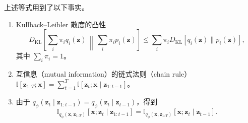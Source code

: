 上述等式用到了以下事实。
\begin{enumerate}
\item Kullback–Leibler 散度的凸性
\[
D_{\mathrm{KL}}\left[\sum_i\pi_i q_i(\mathbf{z})\,\middle\|\,\sum_i\pi_i p_i(\mathbf{z})\right]
 \leq\sum_i\pi_iD_{\mathrm{KL}}[q_i(\mathbf{z})\|p_i(\mathbf{z})],
\]
其中 $\sum_i\pi_i=1$。
\item 互信息（mutual information）的链式法则（chain rule）$\mathbb{I}[\mathbf{z}_{1:T};\mathbf{x}]=\sum_{t=1}^T\mathbb{I}[\mathbf{z}_t;\mathbf{x}\mid\mathbf{z}_{1:t-1}]$。
\item 由于 $q_\phi(\mathbf{z}_t\mid\mathbf{z}_{1:t-1})=q_\phi(\mathbf{z}_t\mid\mathbf{z}_{t-1})$，得到
\[
\mathbb{I}_{q_\phi(\mathbf{x},\mathbf{z}_{1:T})}[\mathbf{x};\mathbf{z}_t\mid\mathbf{z}_{1:t-1}]
 =\mathbb{I}_{q_\phi(\mathbf{x},\mathbf{z}_{1:T})}[\mathbf{x};\mathbf{z}_t\mid\mathbf{z}_{t-1}].
\]
\end{enumerate}

